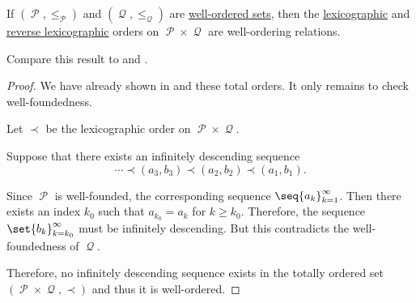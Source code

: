 \begin{proposition}\label{thm:well_ordered_lexicographic_order_is_well_ordered}
  If \( (\mscrP, \leq_\mscrP) \) and \( (\mscrQ, \leq_\mscrQ) \) are \hyperref[def:well_ordered_set]{well-ordered sets}, then the \hyperref[eq:def:lexicographic_order]{lexicographic} and \hyperref[eq:def:lexicographic_order/reverse]{reverse lexicographic} orders on \( \mscrP \times \mscrQ \) are well-ordering relations.

  Compare this result to  and .
\end{proposition}
\begin{proof}
  We have already shown in  and these total orders. It only remains to check well-foundedness.

   Let \( \prec \) be the lexicographic order on \( \mscrP \times \mscrQ \).

  Suppose that there exists an infinitely descending sequence
  \begin{equation*}
    \cdots \prec (a_3, b_3) \prec (a_2, b_2) \prec (a_1, b_1).
  \end{equation*}

  Since \( \mscrP \) is well-founded, the corresponding sequence \( \seq{ a_k }_{k=1}^\infty \). Then there exists an index \( k_0 \) such that \( a_{k_0} = a_k \) for \( k \geq k_0 \). Therefore, the sequence \( \set{ b_k }_{k=k_0}^\infty \) must be infinitely descending. But this contradicts the well-foundedness of \( \mscrQ \).

  Therefore, no infinitely descending sequence exists in the totally ordered set \( (\mscrP \times \mscrQ, \prec) \) and thus it is well-ordered.
\end{proof}
